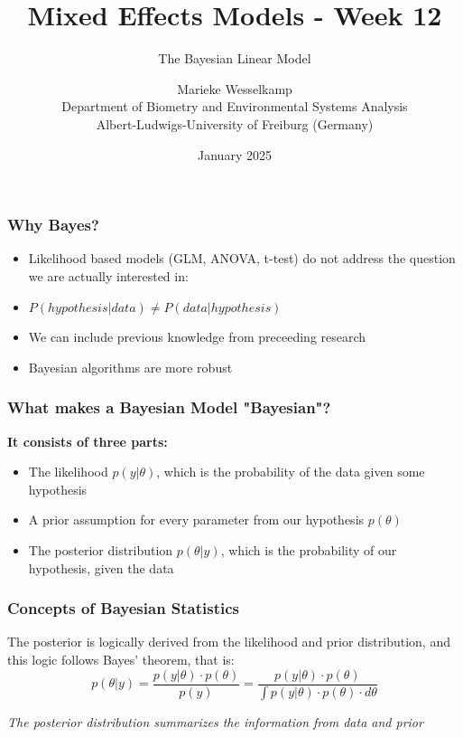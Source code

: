 \documentclass{beamer}
\title{Mixed Effects Models - Week 12}
\subtitle{The Bayesian Linear Model}
\author{Marieke Wesselkamp\\Department of Biometry and Environmental Systems Analysis\\Albert-Ludwigs-University of Freiburg (Germany)}
\date{January 2025}
\begin{document}
\frame{\titlepage}

\begin{frame}
    \frametitle{Why Bayes?}
    \large
    \begin{itemize}
        \item Likelihood based models (GLM, ANOVA, t-test) do not address the question we are actually interested in:
        \item[] $P(hypothesis|data) \neq P(data|hypothesis)$
        \item We can include previous knowledge from preceeding research
        \item Bayesian algorithms are more robust
    \end{itemize}
\end{frame}

\begin{frame}
    \frametitle{What makes a Bayesian Model "Bayesian"?}
    \large
    \textbf{It consists of three parts:}
    \begin{itemize}
        \item The likelihood $p(y|\theta)$, which is the probability of the data given some hypothesis
        \item A prior assumption for every parameter from our hypothesis $p(\theta)$
        \item The posterior distribution $p(\theta|y)$, which is the probability of our hypothesis, given the data
    \end{itemize}
\end{frame}

\begin{frame}
    \frametitle{Concepts of Bayesian Statistics}
    \large
    The posterior is logically derived from the likelihood and prior distribution, and this logic follows Bayes' theorem, that is:
    \[
    p(\theta|y) = \frac{p(y|\theta) \cdot p(\theta)}{p(y)} = \frac{p(y|\theta) \cdot p(\theta)}{\int p(y|\theta) \cdot p(\theta) \cdot d\theta}
    \]
    \vspace{0.2cm}

    \textit{The posterior distribution summarizes the information from data and prior}
\end{frame}
\end{document}

